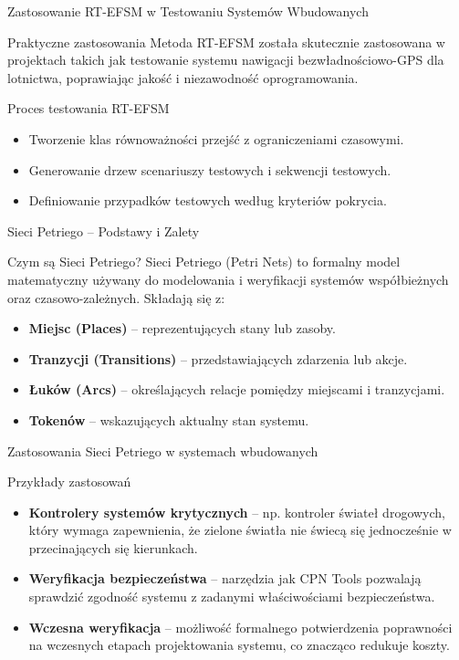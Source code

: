 \documentclass{beamer}
\begin{document}
\begin{frame}{Zastosowanie RT-EFSM w Testowaniu Systemów Wbudowanych}
  \begin{block}{Praktyczne zastosowania}
    Metoda RT-EFSM została skutecznie zastosowana w projektach takich jak testowanie systemu nawigacji bezwładnościowo-GPS dla lotnictwa,
    poprawiając jakość i niezawodność oprogramowania.
  \end{block}

  \begin{block}{Proces testowania RT-EFSM}
    \begin{itemize}
      \item Tworzenie klas równoważności przejść z ograniczeniami czasowymi.
      \item Generowanie drzew scenariuszy testowych i sekwencji testowych.
      \item Definiowanie przypadków testowych według kryteriów pokrycia.
    \end{itemize}
  \end{block}
\end{frame}

\begin{frame}{Sieci Petriego – Podstawy i Zalety}
  \begin{block}{Czym są Sieci Petriego?}
    Sieci Petriego (Petri Nets) to formalny model matematyczny używany do modelowania i weryfikacji systemów współbieżnych oraz czasowo-zależnych. Składają się z:
  \begin{itemize}
    \item \textbf{Miejsc (Places)} – reprezentujących stany lub zasoby.
    \item \textbf{Tranzycji (Transitions)} – przedstawiających zdarzenia lub akcje.
    \item \textbf{Łuków (Arcs)} – określających relacje pomiędzy miejscami i tranzycjami.
    \item \textbf{Tokenów} – wskazujących aktualny stan systemu.
  \end{itemize}
  \end{block}
\end{frame}

\begin{frame}{Zastosowania Sieci Petriego w systemach wbudowanych}
  \begin{block}{Przykłady zastosowań}
    \begin{itemize}
      \item \textbf{Kontrolery systemów krytycznych} – np. kontroler świateł drogowych, który wymaga zapewnienia, że zielone światła nie świecą się jednocześnie w przecinających się kierunkach.
      \item \textbf{Weryfikacja bezpieczeństwa} – narzędzia jak CPN Tools pozwalają sprawdzić zgodność systemu z zadanymi właściwościami bezpieczeństwa.
      \item \textbf{Wczesna weryfikacja} – możliwość formalnego potwierdzenia poprawności na wczesnych etapach projektowania systemu, co znacząco redukuje koszty.
    \end{itemize}
  \end{block}
\end{frame}
\end{document}
